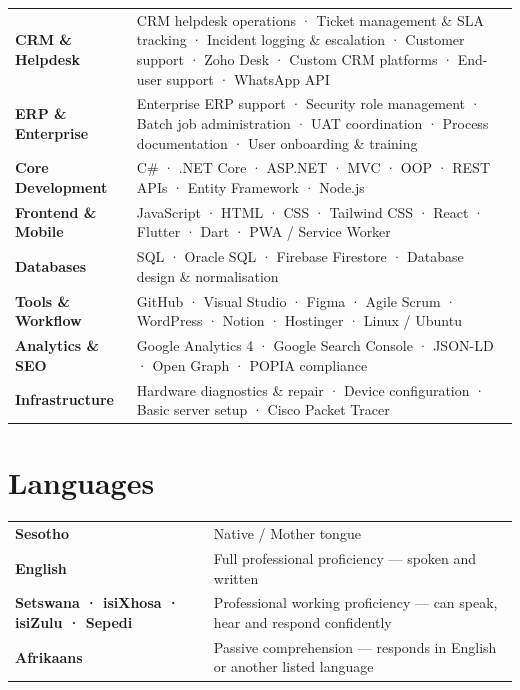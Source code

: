 \documentclass[a4paper,10.5pt]{article}
\begin{document}
\vspace{5pt}
\begin{tabularx}{\linewidth}{@{}l X@{}}
  \textbf{CRM \& Helpdesk}    & CRM helpdesk operations · Ticket management \& SLA tracking · Incident logging \& escalation · Customer support · Zoho Desk · Custom CRM platforms · End-user support · WhatsApp API \\[3pt]
  \textbf{ERP \& Enterprise}  & Enterprise ERP support · Security role management · Batch job administration · UAT coordination · Process documentation · User onboarding \& training \\[3pt]
  \textbf{Core Development}   & C\# · .NET Core · ASP.NET · MVC · OOP · REST APIs · Entity Framework · Node.js \\[3pt]
  \textbf{Frontend \& Mobile} & JavaScript · HTML · CSS · Tailwind CSS · React · Flutter · Dart · PWA / Service Worker \\[3pt]
  \textbf{Databases}          & SQL · Oracle SQL · Firebase Firestore · Database design \& normalisation \\[3pt]
  \textbf{Tools \& Workflow}  & GitHub · Visual Studio · Figma · Agile Scrum · WordPress · Notion · Hostinger · Linux / Ubuntu \\[3pt]
  \textbf{Analytics \& SEO}   & Google Analytics 4 · Google Search Console · JSON-LD · Open Graph · POPIA compliance \\[3pt]
  \textbf{Infrastructure}     & Hardware diagnostics \& repair · Device configuration · Basic server setup · Cisco Packet Tracer \\
\end{tabularx}

\section{Languages}

\vspace{5pt}
\begin{tabularx}{\linewidth}{@{}l X@{}}
  \textbf{Sesotho}                                & Native / Mother tongue \\[2pt]
  \textbf{English}                                & Full professional proficiency --- spoken and written \\[2pt]
  \textbf{Setswana · isiXhosa · isiZulu · Sepedi} & Professional working proficiency --- can speak, hear and respond confidently \\[2pt]
  \textbf{Afrikaans}                              & Passive comprehension --- responds in English or another listed language \\
\end{tabularx}
\end{document}
